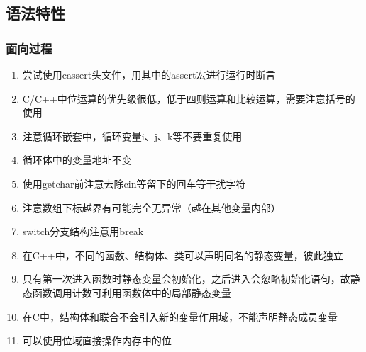 \documentclass[onecolumn]{article}
\begin{document}
    \subsection{语法特性}
        \subsubsection{面向过程}
            \noindent
            \begin{enumerate}
                \item 尝试使用cassert头文件，用其中的assert宏进行运行时断言
                \item C/C++中位运算的优先级很低，低于四则运算和比较运算，需要注意括号的使用
                \item 注意循环嵌套中，循环变量i、j、k等不要重复使用
                \item 循环体中的变量地址不变
                \item 使用getchar前注意去除cin等留下的回车等干扰字符
                \item 注意数组下标越界有可能完全无异常（越在其他变量内部）
                \item switch分支结构注意用break
                \item 在C++中，不同的函数、结构体、类可以声明同名的静态变量，彼此独立
                \item 只有第一次进入函数时静态变量会初始化，之后进入会忽略初始化语句，故静态函数调用计数可利用函数体中的局部静态变量
                \item 在C中，结构体和联合不会引入新的变量作用域，不能声明静态成员变量
                \item 可以使用位域直接操作内存中的位
            \end{enumerate}
\end{document}
